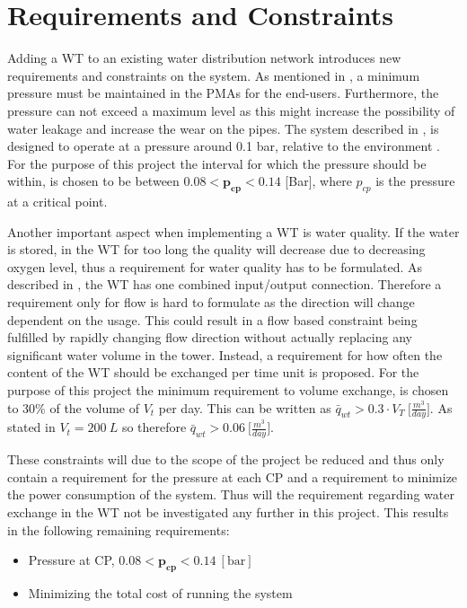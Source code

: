 \chapter{Requirements and Constraints}
\label{Requirements_and_constraints}

Adding a WT to an existing water distribution network introduces new requirements and constraints on the system. 
As mentioned in , a minimum pressure must be maintained in the PMAs for the end-users. Furthermore, the pressure can not exceed a maximum level as this might increase the possibility of water leakage and increase the wear on the pipes. The system described in , is designed to operate at a pressure around 0.1 bar, relative to the environment \cite{master_aau}. For the purpose of this project the interval for which the pressure should be within, is chosen to be between $0.08 < \pmb{p_{cp}} < 0.14$ [Bar], where $p_{cp}$ is the pressure at a critical point.

Another important aspect when implementing a WT is water quality. If the water is stored, in the WT for too long the quality will decrease due to decreasing oxygen level, thus a requirement for water quality has to be formulated. As described in , the WT has one combined input/output connection. Therefore a requirement only for flow is hard to formulate as the direction will change dependent on the usage. This could result in a flow based constraint being fulfilled by rapidly changing flow direction without actually replacing any significant water volume in the tower. Instead, a requirement for how often the content of the WT should be exchanged per time unit is proposed. For the purpose of this project the minimum requirement to volume exchange, is chosen to 30\% of the volume of $V_t$ per day. This can be written as $\bar{q}_{wt} > 0.3\cdot V_T \: \big[\frac{m^3}{day}\big]$. As stated in  $V_t = 200 \:L$ so therefore $\bar{q}_{wt} > 0.06 \: \big[\frac{m^3}{day}\big]$.

These constraints will due to the scope of the project be reduced and thus only contain a requirement for the pressure at each CP and a requirement to minimize the power consumption of the system. Thus will the requirement regarding water exchange in the WT not be investigated any further in this project. 
This results in the following remaining requirements:

\begin{itemize}
	\item Pressure at CP, $0.08 < \pmb{p_{cp}} < 0.14 \:[\text{bar}]$
%
	\item Minimizing the total cost of running the system
\end{itemize}
 